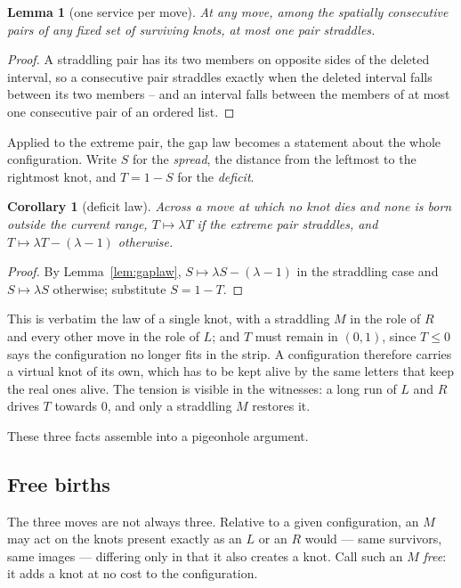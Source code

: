 \documentclass[11pt,reqno]{amsart}
\theoremstyle{plain}
\newtheorem{lemma}[theorem]{Lemma}
\newtheorem{corollary}[theorem]{Corollary}
\theoremstyle{definition}
\theoremstyle{remark}
\begin{document}
\begin{lemma}[one service per move]\label{lem:service}
At any move, among the spatially consecutive pairs of any fixed set of
surviving knots, at most one pair straddles.
\end{lemma}

\begin{proof}
A straddling pair has its two members on opposite sides of the deleted
interval, so a consecutive pair straddles exactly when the deleted interval
falls between its two members -- and an interval falls between the members of
at most one consecutive pair of an ordered list.
\end{proof}

Applied to the extreme pair, the gap law becomes a statement about the whole
configuration. Write $S$ for the \emph{spread}, the distance from the leftmost
to the rightmost knot, and $T=1-S$ for the \emph{deficit}.

\begin{corollary}[deficit law]\label{cor:deficit}
Across a move at which no knot dies and none is born outside the current
range, $T\mapsto\lambda T$ if the extreme pair straddles, and
$T\mapsto\lambda T-(\lambda-1)$ otherwise.
\end{corollary}

\begin{proof}
By Lemma~\ref{lem:gaplaw}, $S\mapsto\lambda S-(\lambda-1)$ in the straddling
case and $S\mapsto\lambda S$ otherwise; substitute $S=1-T$.
\end{proof}

This is verbatim the law of a single knot, with a straddling $M$ in the role of
$R$ and every other move in the role of $L$; and $T$ must remain in $(0,1)$,
since $T\leq0$ says the configuration no longer fits in the strip. A
configuration therefore carries a virtual knot of its own, which has to be kept
alive by the same letters that keep the real ones alive. The tension is visible
in the witnesses: a long run of $L$ and $R$ drives $T$ towards $0$, and only a
straddling $M$ restores it.

These three facts assemble into a pigeonhole argument.

\subsection{Free births}
The three moves are not always three. Relative to a given configuration, an $M$
may act on the knots present exactly as an $L$ or an $R$ would --- same
survivors, same images --- differing only in that it also creates a knot. Call
such an $M$ \emph{free}: it adds a knot at no cost to the configuration.
\end{document}

